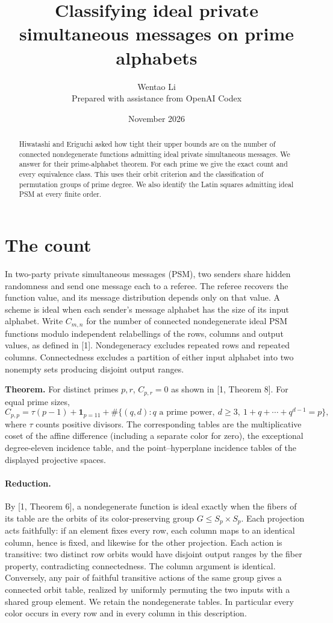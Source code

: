 \documentclass[11pt]{article}
\title{Classifying ideal private simultaneous messages on prime alphabets}
\author{Wentao Li\\[2pt]\small Prepared with assistance from OpenAI Codex}
\date{November 2026}
\begin{document}
\maketitle
\begin{abstract}
Hiwatashi and Eriguchi asked how tight their upper bounds are on the number of connected nondegenerate functions admitting ideal private simultaneous messages. We answer for their prime-alphabet theorem. For each prime we give the exact count and every equivalence class. This uses their orbit criterion and the classification of permutation groups of prime degree. We also identify the Latin squares admitting ideal PSM at every finite order.
\end{abstract}

\section{The count}
In two-party private simultaneous messages (PSM), two senders share hidden randomness and send one message each to a referee. The referee recovers the function value, and its message distribution depends only on that value. A scheme is ideal when each sender's message alphabet has the size of its input alphabet. Write $C_{m,n}$ for the number of connected nondegenerate ideal PSM functions modulo independent relabellings of the rows, columns and output values, as defined in [1]. Nondegeneracy excludes repeated rows and repeated columns. Connectedness excludes a partition of either input alphabet into two nonempty sets producing disjoint output ranges.

\textbf{Theorem.} For distinct primes $p,r$, $C_{p,r}=0$ as shown in [1, Theorem 8]. For equal prime sizes,
\[
 C_{p,p}=\tau(p-1)+\mathbf 1_{p=11}
 +\#\{(q,d): q\text{ a prime power},\ d\ge3,\ 1+q+\cdots+q^{d-1}=p\},
\]
where $\tau$ counts positive divisors. The corresponding tables are the multiplicative coset of the affine difference (including a separate color for zero), the exceptional degree-eleven incidence table, and the point--hyperplane incidence tables of the displayed projective spaces.

\paragraph{Reduction.} By [1, Theorem 6], a nondegenerate function is ideal exactly when the fibers of its table are the orbits of its color-preserving group $G\le S_p\times S_p$. Each projection acts faithfully: if an element fixes every row, each column maps to an identical column, hence is fixed, and likewise for the other projection. Each action is transitive: two distinct row orbits would have disjoint output ranges by the fiber property, contradicting connectedness. The column argument is identical. Conversely, any pair of faithful transitive actions of the same group gives a connected orbit table, realized by uniformly permuting the two inputs with a shared group element. We retain the nondegenerate tables. In particular every color occurs in every row and in every column in this description.
\end{document}
